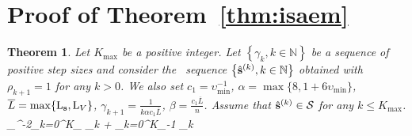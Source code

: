 \documentclass[11pt]{article}
\newtheorem*{Theorem*}{Theorem}
\theoremstyle{t}
\begin{document}
\section{Proof of Theorem~\ref{thm:isaem}}\label{app:theoremisaem}
\begin{Theorem*}
Let $K_{\max }$ be a positive integer. 
Let $\left\{\gamma_{k}, k \in \mathbb{N}\right\}$ be a sequence of positive step sizes and consider the \ISAEM\ sequence $\left\{\hat{{\mathbf{s}}}^{(k)}, k \in \mathbb{N}\right\}$ obtained with $\rho_{k+1}=1$ for any $k>0$. We also set $c_1 = \upsilon_{\min}^{-1}$, $\alpha = \max\{8, 1+6\upsilon_{\min}\}$, $\overline{L} = \max\{ \operatorname{L}_{{\mathbf{s}}} , \operatorname{L}_{V} \}$, $\gamma_{k+1} = \frac{1}{k \alpha c_1 \overline{L}}$, $\beta = \frac{c_1 \overline{L}}{n}$. 
Assume that $ \hat{{\mathbf{s}}}^{(k)} \in \mathcal{S}$ for any $k \leq K_{\max }$.
\beq
\upsilon_{\max}^{-2}\sum_{k=0}^{K_{\max}} \tilde{\alpha}_k \EE {}  \leq   \EE \left[ V( \hs{0} ) - V( \hs{K} ) \right]+ \sum_{k=0}^{K_{\max}-1} \tilde{\Gamma}_k         \EE {} 
\eeq
\end{Theorem*} 
\end{document}
